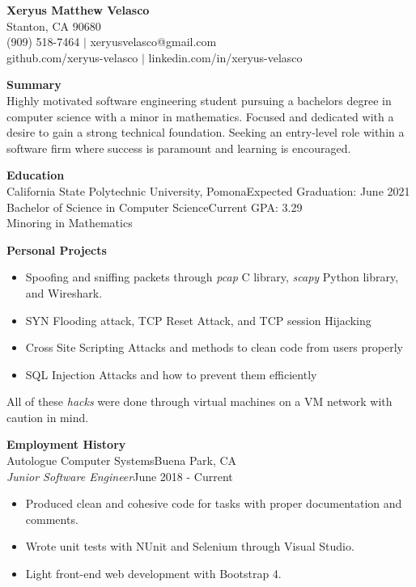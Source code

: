 \documentclass[12pt, letterpaper]{article}
\begin{document}
	\begin{flushleft}
		\textbf{\large Xeryus Matthew Velasco}\\
		Stanton, CA 90680\\
		(909) 518-7464 $\vert$ xeryusvelasco@gmail.com\\
		github.com/xeryus-velasco $\vert$ linkedin.com/in/xeryus-velasco\vspace{5mm}
		
\textbf{\large Summary}\\
Highly motivated software engineering student pursuing a bachelors degree in computer science with a minor in mathematics. Focused and dedicated with a desire to gain a strong technical foundation. Seeking an entry-level role within a software firm where success is paramount and learning is encouraged.\vspace{5mm}

\textbf{\large Education}\\
California State Polytechnic University, Pomona\hfill Expected Graduation: June 2021\\
Bachelor of Science in Computer Science\hfill Current GPA: 3.29\\
Minoring in Mathematics\vspace{5mm}

\textbf{\large Personal Projects}\\
\begin{itemize}
	\item Spoofing and sniffing packets through \textit{pcap} C library, \textit{scapy} Python library, and Wireshark.
	\item SYN Flooding attack, TCP Reset Attack, and TCP session Hijacking 
	\item Cross Site Scripting Attacks and methods to clean code from users properly 
	\item SQL Injection Attacks and how to prevent them efficiently
\end{itemize}
All of these \textit{hacks} were done through virtual machines on a VM network with caution in mind.\vspace{5mm} 

\textbf{\large Employment History}\\
Autologue Computer Systems\hfill Buena Park, CA\\
\textit{Junior Software Engineer}\hfill June 2018 - Current
\begin{itemize}
  \item Produced clean and cohesive code for tasks with proper documentation and comments.
  \item Wrote unit tests with NUnit and Selenium through Visual Studio.
  \item Light front-end web development with Bootstrap 4.
\end{itemize}


\end{flushleft}
\end{document}

